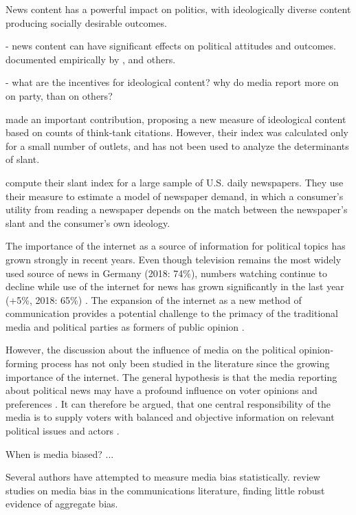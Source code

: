 \documentclass[12pt,a4paper,notitlepage]{article}
\begin{document}
News content has a powerful impact on politics, with ideologically diverse content producing socially desirable outcomes.

- news content can have significant effects on political attitudes and outcomes. documented empirically by \citet{stromberg_radios_2004, gentzkow_media_2004, gentzkow_television_2006, gerber_does_2009, dellavigna_fox_2007}, and others.

- what are the incentives for ideological content? why do media report more on on party, than on others?

\citet{groseclose_measure_2005} made an important contribution, proposing a new measure of ideological content based on counts of think-tank citations. However, their index was calculated only for a small number of outlets, and has not been used to analyze the determinants of slant.

\citet{gentzkow_what_2010} compute their slant index for a large sample of U.S. daily newspapers. They use their measure to estimate a model of newspaper demand, in which a consumer's utility from reading a newspaper depends on the match between the newspaper's slant and the consumer's own ideology.

The importance of the internet as a source of information for political topics has grown strongly in recent years. Even though television remains the most widely used source of news in Germany (2018: 74\%), numbers watching continue to decline while use of the internet for news has grown significantly in the last year (+5\%, 2018: 65\%) \citep{holig_reuters_2018}. The expansion of the internet as a new method of communication provides a potential challenge to the primacy of the traditional media and political parties as formers of public opinion \citep{savigny_public_2002}.

However, the discussion about the influence of media on the political opinion-forming process has not only been studied in the literature since the growing importance of the internet. The general hypothesis is that the media reporting about political news may have a profound influence on voter opinions and preferences \citep{ferree_four_2002, mccombs_look_2005, eberl_one_2017}. It can therefore be argued, that one central responsibility of the media is to supply voters with balanced and objective information on relevant political issues and actors \citep{stromback_four_2008, eberl_one_2017}. 

When is media biased? ...

Several authors have attempted to measure media bias statistically. \citet{dalessio_media_2000} review studies on media bias in the communications literature, finding little robust evidence of aggregate bias.
\end{document}
